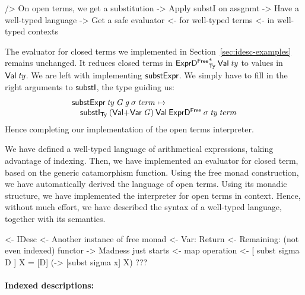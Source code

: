 \begin{wstructure}
    /> On open terms, we get a substitution
        -> Apply substI on assgnmt
            -> Have a well-typed language
            -> Get a safe evaluator 
                <- for well-typed terms 
                <- in well-typed contexts
\end{wstructure}

The evaluator for closed terms we implemented in
Section~\ref{sec:idesc-examples} remains unchanged. It reduces closed
terms in $\FreeIMonad{\HExprFreeD}{\Ty}{\SYMBVal}\: \V{ty}$ to values in
$\Val{\V{ty}}$. We are left with implementing $\substH$. We simply
have to fill in the right arguments to $\substI$, the type guiding us:
%
\[\stk{
\substH\: \V{ty}\:
          \V{G}\:
          \V{g}\:
          \V{\sigma}\: 
          \V{term} \mapsto  \\
\quad \substI_{\Ty}\:
               (\SUM{\SYMBVal}{\SYMBVar\: \V{G}})\: 
               \SYMBVal\:
               \HExprFreeD\: 
               \V{\sigma}\:
               \V{ty}\:
               \V{term}
}\]
%
Hence completing our implementation of the open terms interpreter. 

We have defined a well-typed language of arithmetical expressions,
taking advantage of indexing. Then, we have implemented an evaluator
for closed term, based on the generic catamorphism function. Using the
free monad construction, we have automatically derived the language of
open terms. Using its monadic structure, we have implemented the
interpreter for open terms in context. Hence, without much effort, we
have described the syntax of a well-typed language, together with its
semantics.

\begin{wstructure}
<- IDesc
    <- Another instance of free monad
        <- Var: Return
        <- Remaining: (not even indexed) functor
    -> Madness just starts
        <- map operation
        <- [ subst sigma D ] X = [D] (\x -> [subst sigma x] X)
        ???
\end{wstructure}

\paragraph{Indexed descriptions:}

